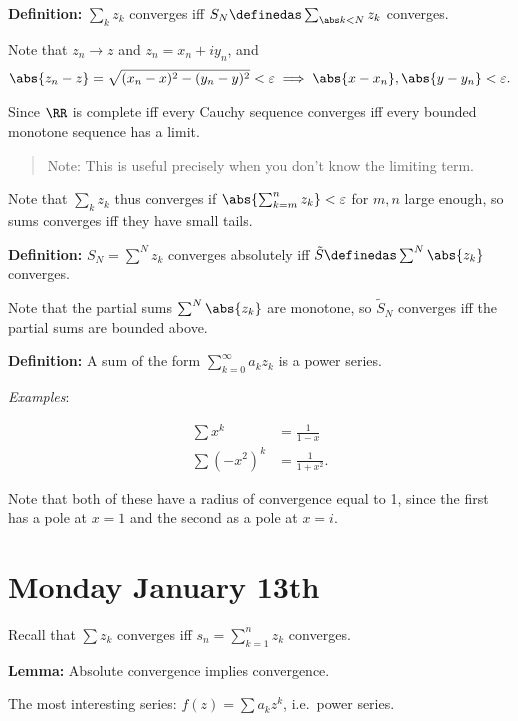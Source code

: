 \textbf{Definition:} \(\sum_k z_k\) converges iff
\(S_N \definedas \sum_{\abs k < N} z_k\) converges.

Note that \(z_n \to z\) and \(z_n = x_n + iy_n\), and
\begin{align*}\abs{z_n - z} = \sqrt{(x_n - x)^2 - (y_n - y)^2} < \varepsilon \implies \abs{x - x_n}, \abs{y - y_n} < \varepsilon.\end{align*}

Since \(\RR\) is complete iff every Cauchy sequence converges iff every
bounded monotone sequence has a limit.

\begin{quote}
Note: This is useful precisely when you don't know the limiting term.
\end{quote}

Note that \(\sum_k z_k\) thus converges if
\(\abs{\sum_{k=m}^n z_k} < \varepsilon\) for \(m, n\) large enough, so
sums converges iff they have small tails.

\textbf{Definition:} \(S_N = \sum^N z_k\) converges absolutely iff
\(\tilde S \definedas \sum^N \abs{z_k}\) converges.

Note that the partial sums \(\sum^N \abs{z_k}\) are monotone, so
\(\tilde S_N\) converges iff the partial sums are bounded above.

\textbf{Definition:} A sum of the form \(\sum_{k=0}^\infty a_k z_k\) is
a power series.

\emph{Examples}:

\begin{align*}
\sum x^k &= \frac 1 {1-x} \\
\sum (-x^2)^k &= \frac 1 {1+x^2}
.\end{align*}

Note that both of these have a radius of convergence equal to 1, since
the first has a pole at \(x=1\) and the second as a pole at \(x = i\).

\hypertarget{monday-january-13th}{%
\section{Monday January 13th}\label{monday-january-13th}}

Recall that \(\sum z_k\) converges iff \(s_n = \sum_{k=1}^n z_k\)
converges.

\textbf{Lemma:} Absolute convergence implies convergence.

The most interesting series: \(f(z) = \sum a_k z^k\), i.e.~power series.

